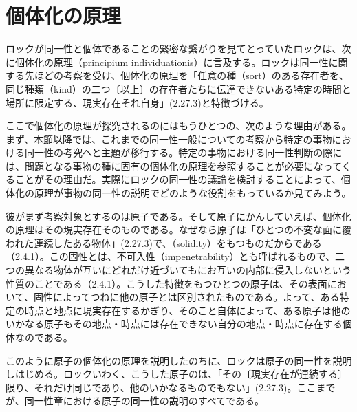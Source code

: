 \documentclass[a4j,oneside]{jsbook}
\begin{document}
\section{
個体化の原理
}
ロックが同一性と個体であることの緊密な繋がりを見てとっていたロックは、次に個体化の原理（principium individuationis）に言及する。ロックは同一性に関する先ほどの考察を受け、個体化の原理を「任意の種（sort）のある存在者を、同じ種類（kind）の二つ〔以上〕の存在者たちに伝達できないある特定の時間と場所に限定する、現実存在それ自身」(2.27.3)と特徴づける。
\par
ここで個体化の原理が探究されるのにはもうひとつの、次のような理由がある。まず、本節以降では、これまでの同一性一般についての考察から特定の事物における同一性の考究へと主題が移行する。特定の事物における同一性判断の際には、問題となる事物の種に固有の個体化の原理を参照することが必要になってくることがその理由だ。実際にロックの同一性の議論を検討することによって、個体化の原理が事物の同一性の説明でどのような役割をもっているか見てみよう。
\par
彼がまず考察対象とするのは原子である。そして原子にかんしていえば、個体化の原理はその現実存在そのものである。なぜなら原子は「ひとつの不変な面に覆われた連続したある物体」(2.27.3)で、（solidity）をもつものだからである（2.4.1）。この固性とは、不可入性（impenetrability）とも呼ばれるもので、二つの異なる物体が互いにどれだけ近づいてもにお互いの内部に侵入しないという性質のことである（2.4.1）。こうした特徴をもつひとつの原子は、その表面において、固性によってつねに他の原子とは区別されたものである。よって、ある特定の時点と地点に現実存在するかぎり、そのこと自体によって、ある原子は他のいかなる原子もその地点・時点には存在できない自分の地点・時点に存在する個体なのである。
\par
このように原子の個体化の原理を説明したのちに、ロックは原子の同一性を説明しはじめる。ロックいわく、こうした原子のは、「その〔現実存在が連続する〕限り、それだけ同じであり、他のいかなるものでもない」(2.27.3)。ここまでが、同一性章における原子の同一性の説明のすべてである。
\par
\end{document}
